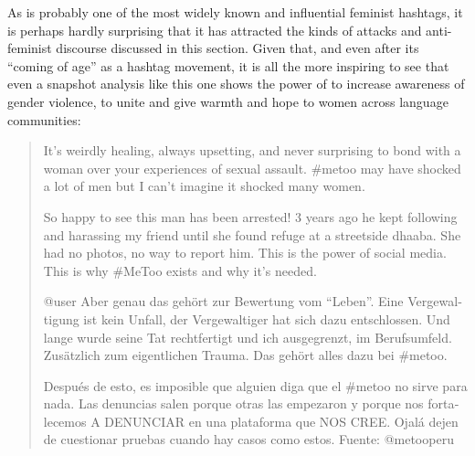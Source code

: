 \documentclass[output=paper,english,spanish,german,english]{langsci/langscibook}
\begin{document}
\noindent As \mt is probably one of the most widely known and influential feminist hashtags, it is perhaps hardly surprising that it has attracted the kinds of attacks and anti-feminist discourse discussed in this section. Given that, and even after its \enquote{coming of age} as a hashtag movement, it is all the more inspiring to see that even a snapshot analysis like this one shows the power of \mt to increase awareness of gender violence, to unite and give warmth and hope to women across language communities:

\begin{quote}\sffamily
  It’s weirdly healing, always upsetting, and never surprising to bond with a woman over your experiences of sexual assault. \#metoo may have shocked a lot of men but I can’t imagine it shocked many women.

  So happy to see this man has been arrested! 3 years ago he kept following and harassing my friend until she found refuge at a streetside dhaaba. She had no photos, no way to report him. This is the power of social media. This is why \#MeToo exists and why it's needed.

  \foreignlanguage{german}{@user Aber genau das gehört zur Bewertung vom \enquote{Leben}. Eine Vergewaltigung ist kein Unfall, der Vergewaltiger hat sich dazu entschlossen. Und lange wurde seine Tat rechtfertigt und ich ausgegrenzt, im Berufsumfeld. Zusätzlich zum eigentlichen Trauma. Das gehört alles dazu bei \#metoo.}

  \foreignlanguage{spanish}{Después de esto, es imposible que alguien diga que el \#metoo no sirve para nada. Las denuncias salen porque otras las empezaron y porque nos fortalecemos A DENUNCIAR en una plataforma que NOS CREE. Ojalá dejen de cuestionar pruebas cuando hay casos como estos. Fuente: @metooperu}
\end{quote}
\end{document}
